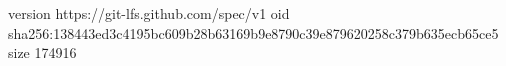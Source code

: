 version https://git-lfs.github.com/spec/v1
oid sha256:138443ed3c4195bc609b28b63169b9e8790c39e879620258c379b635ecb65ce5
size 174916
